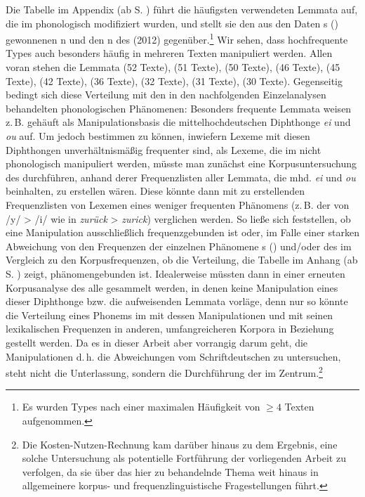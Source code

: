 Die Tabelle  im Appendix (ab S. \pageref{tblFKphon}) führt die häufigsten verwendeten Lemmata auf, die im  phonologisch modifiziert wurden, und stellt sie den aus den Daten \citeauthor{Ruoff1981}s (\citeyear{Ruoff1981}) gewonnenen n und den n des  (2012) gegenüber.\footnote{Es wurden Types nach einer maximalen Häufigkeit von \( \geq4 \)  Texten aufgenommen.} Wir sehen, dass hochfrequente Types auch besonders häufig in mehreren Texten manipuliert werden. Allen voran stehen die Lemmata  (52 Texte),  (51 Texte),  (50 Texte),  (46 Texte),  (45 Texte),  (42 Texte),  (36 Texte),  (32 Texte),  (31 Texte),  (30 Texte). Gegenseitig bedingt sich diese Verteilung mit den in den nachfolgenden Einzelanalysen behandelten phonologischen Phänomenen: Besonders frequente Lemmata weisen z.\,B. gehäuft als Manipulationsbasis die mittelhochdeutschen Diphthonge \textit{ei} und \textit{ou} auf. Um jedoch bestimmen zu können, inwiefern Lexeme mit diesen Diphthongen unverhältnismäßig frequenter sind, als Lexeme, die im  nicht phonologisch manipuliert werden, müsste man zunächst eine Korpusuntersuchung des  durchführen, anhand derer Frequenzlisten aller Lemmata, die mhd. \textit{ei} und \textit{ou} beinhalten, zu erstellen wären. Diese könnte dann mit zu erstellenden Frequenzlisten von Lexemen eines weniger frequenten Phänomens (z.\,B. der  von /y/ > /i/ wie in \textit{zurück} > \textit{zurick}) verglichen werden. So ließe sich feststellen, ob eine Manipulation ausschließlich frequenzgebunden ist oder, im Falle einer starken Abweichung von den Frequenzen der einzelnen Phänomene \citeauthor{Ruoff1981}s (\citeyear{Ruoff1981}) und/oder des  im Vergleich zu den Korpusfrequenzen, ob die Verteilung, die Tabelle im Anhang (ab S. \pageref{tblFKphon}) zeigt, phänomengebunden ist. Idealerweise müssten dann in einer erneuten Korpusanalyse des  alle  gesammelt werden, in denen keine Manipulation eines dieser Diphthonge bzw. die  aufweisenden Lemmata  vorläge,  denn nur so könnte die Verteilung eines Phonems im  mit dessen Manipulationen und mit seinen lexikalischen Frequenzen in anderen, umfangreicheren Korpora in Beziehung gestellt werden. 
 Da es in dieser Arbeit aber vorrangig darum geht, die Manipulationen d.\,h. die Abweichungen vom Schriftdeutschen zu untersuchen, steht nicht die Unterlassung, sondern die Durchführung der  im Zentrum.\footnote{Die Kosten-Nutzen-Rechnung kam darüber hinaus zu dem Ergebnis, eine solche Untersuchung als potentielle Fortführung der vorliegenden Arbeit zu verfolgen, da sie über das hier zu behandelnde Thema weit hinaus in allgemeinere korpus- und frequenzlinguistische Fragestellungen führt.} 


